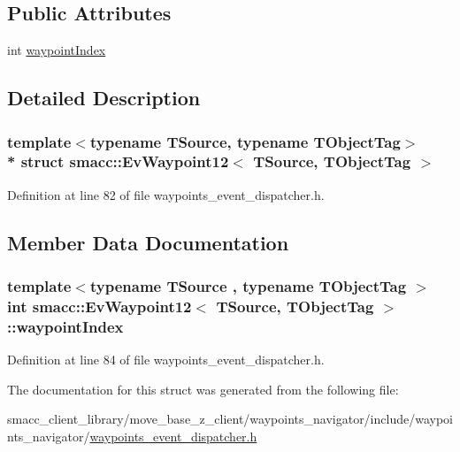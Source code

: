 \subsection*{Public Attributes}
\begin{DoxyCompactItemize}
\item 
int \hyperlink{structsmacc_1_1EvWaypoint12_a4e0c42a5a304b85424af1279628e7f81}{waypoint\+Index}
\end{DoxyCompactItemize}


\subsection{Detailed Description}
\subsubsection*{template$<$typename T\+Source, typename T\+Object\+Tag$>$\\*
struct smacc\+::\+Ev\+Waypoint12$<$ T\+Source, T\+Object\+Tag $>$}



Definition at line 82 of file waypoints\+\_\+event\+\_\+dispatcher.\+h.



\subsection{Member Data Documentation}
\subsubsection[{\texorpdfstring{waypoint\+Index}{waypointIndex}}]{\setlength{\rightskip}{0pt plus 5cm}template$<$typename T\+Source , typename T\+Object\+Tag $>$ int {\bf smacc\+::\+Ev\+Waypoint12}$<$ T\+Source, T\+Object\+Tag $>$\+::waypoint\+Index}\hypertarget{structsmacc_1_1EvWaypoint12_a4e0c42a5a304b85424af1279628e7f81}{}\label{structsmacc_1_1EvWaypoint12_a4e0c42a5a304b85424af1279628e7f81}


Definition at line 84 of file waypoints\+\_\+event\+\_\+dispatcher.\+h.



The documentation for this struct was generated from the following file\+:\begin{DoxyCompactItemize}
\item 
smacc\+\_\+client\+\_\+library/move\+\_\+base\+\_\+z\+\_\+client/waypoints\+\_\+navigator/include/waypoints\+\_\+navigator/\hyperlink{waypoints__event__dispatcher_8h}{waypoints\+\_\+event\+\_\+dispatcher.\+h}\end{DoxyCompactItemize}
